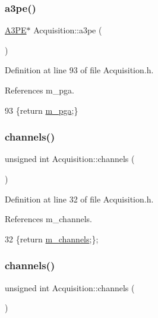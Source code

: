 \subsubsection{\texorpdfstring{a3pe()}{a3pe()}}
{\footnotesize\ttfamily \hyperlink{classA3PE}{A3\+PE}$\ast$ Acquisition\+::a3pe (\begin{DoxyParamCaption}{ }\end{DoxyParamCaption})\hspace{0.3cm}{\ttfamily [inline]}}



Definition at line 93 of file Acquisition.\+h.



References m\+\_\+pga.


\begin{DoxyCode}
93 \{\textcolor{keywordflow}{return} \hyperlink{classAcquisition_aac113fd42c6574cdb4154e9808a21b67}{m\_pga};\}
\end{DoxyCode}
\mbox{\label{classAcquisition_a3041537afcb4dfe5c6940f0ef6829265}} 
\subsubsection{\texorpdfstring{channels()}{channels()}\hspace{0.1cm}{\footnotesize\ttfamily [1/2]}}
{\footnotesize\ttfamily unsigned int Acquisition\+::channels (\begin{DoxyParamCaption}{ }\end{DoxyParamCaption})\hspace{0.3cm}{\ttfamily [inline]}}



Definition at line 32 of file Acquisition.\+h.



References m\+\_\+channels.


\begin{DoxyCode}
32 \{\textcolor{keywordflow}{return} \hyperlink{classAcquisition_aedc8b29f322ef00540797fbd0d5112d1}{m\_channels};\};
\end{DoxyCode}
\mbox{\label{classAcquisition_a3041537afcb4dfe5c6940f0ef6829265}} 
\subsubsection{\texorpdfstring{channels()}{channels()}\hspace{0.1cm}{\footnotesize\ttfamily [2/2]}}
{\footnotesize\ttfamily unsigned int Acquisition\+::channels (\begin{DoxyParamCaption}{ }\end{DoxyParamCaption})\hspace{0.3cm}{\ttfamily [inline]}}



